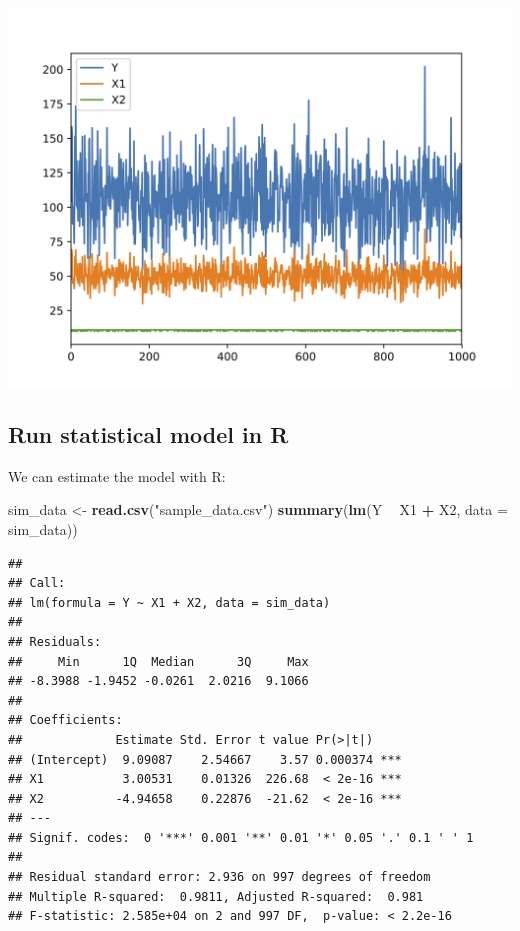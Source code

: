 \documentclass[]{book}
\newenvironment{Shaded}{\begin{snugshade}}{\end{snugshade}}
\newcommand{\KeywordTok}[1]{\textcolor[rgb]{0.13,0.29,0.53}{\textbf{#1}}}
\newcommand{\DataTypeTok}[1]{\textcolor[rgb]{0.13,0.29,0.53}{#1}}
\newcommand{\StringTok}[1]{\textcolor[rgb]{0.31,0.60,0.02}{#1}}
\newcommand{\OperatorTok}[1]{\textcolor[rgb]{0.81,0.36,0.00}{\textbf{#1}}}
\newcommand{\NormalTok}[1]{#1}
\theoremstyle{definition}
\theoremstyle{definition}
\theoremstyle{definition}
\theoremstyle{remark}
\begin{document}
\includegraphics{images/ch1_plot.jpg}

\subsection{Run statistical model in
R}\label{run-statistical-model-in-r}

We can estimate the model with R:

\begin{Shaded}
\begin{Highlighting}[]
\NormalTok{sim_data <-}\StringTok{ }\KeywordTok{read.csv}\NormalTok{(}\StringTok{"sample_data.csv"}\NormalTok{)}
\KeywordTok{summary}\NormalTok{(}\KeywordTok{lm}\NormalTok{(Y }\OperatorTok{~}\StringTok{ }\NormalTok{X1 }\OperatorTok{+}\StringTok{ }\NormalTok{X2, }\DataTypeTok{data =}\NormalTok{ sim_data))}
\end{Highlighting}
\end{Shaded}

\begin{verbatim}
## 
## Call:
## lm(formula = Y ~ X1 + X2, data = sim_data)
## 
## Residuals:
##     Min      1Q  Median      3Q     Max 
## -8.3988 -1.9452 -0.0261  2.0216  9.1066 
## 
## Coefficients:
##             Estimate Std. Error t value Pr(>|t|)    
## (Intercept)  9.09087    2.54667    3.57 0.000374 ***
## X1           3.00531    0.01326  226.68  < 2e-16 ***
## X2          -4.94658    0.22876  -21.62  < 2e-16 ***
## ---
## Signif. codes:  0 '***' 0.001 '**' 0.01 '*' 0.05 '.' 0.1 ' ' 1
## 
## Residual standard error: 2.936 on 997 degrees of freedom
## Multiple R-squared:  0.9811, Adjusted R-squared:  0.981 
## F-statistic: 2.585e+04 on 2 and 997 DF,  p-value: < 2.2e-16
\end{verbatim}
\end{document}
